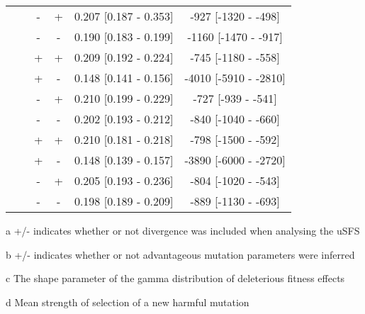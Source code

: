 \begin{table}
\begin{threeparttable}[b]
\begin{tabular}{cccccc}
      &&   - &        + &  0.207 [0.187 - 0.353] &  -927 [-1320 -  -498] \\
        && - &        - &  0.190 [0.183 - 0.199] & -1160 [-1470 -  -917] \\
&&         + &        + &  0.209 [0.192 - 0.224] &  -745 [-1180 -  -558] \\
  &&       + &        - &  0.148 [0.141 - 0.156] & -4010 [-5910 -  -2810] \\
    &&     - &        + &  0.210 [0.199 - 0.229] &  -727 [-939 -  -541] \\
      &&   - &        - &  0.202 [0.193 - 0.212] &  -840 [-1040 -  -660] \\
        && + &        + &  0.210 [0.181 - 0.218] &  -798 [-1500 -  -592] \\
&&         + &        - &  0.148 [0.139 - 0.157] & -3890 [-6000 -  -2720] \\
  &&       - &        + &  0.205 [0.193 - 0.236] &  -804 [-1020 -  -543] \\
    &&     - &        - &  0.198 [0.189 - 0.209] &  -889 [-1130 -  -693] \\
\bottomrule
\end{tabular}

   \begin{tablenotes}
     \item[a] +/- indicates whether or not divergence was included when analysing the uSFS
     \item[b] +/- indicates whether or not advantageous mutation parameters were inferred
     \item[c] The shape parameter of the gamma distribution of deleterious fitness effects
     \item[d] Mean strength of selection of a new harmful mutation
   \end{tablenotes}
  \end{threeparttable}
  
\end{table}

